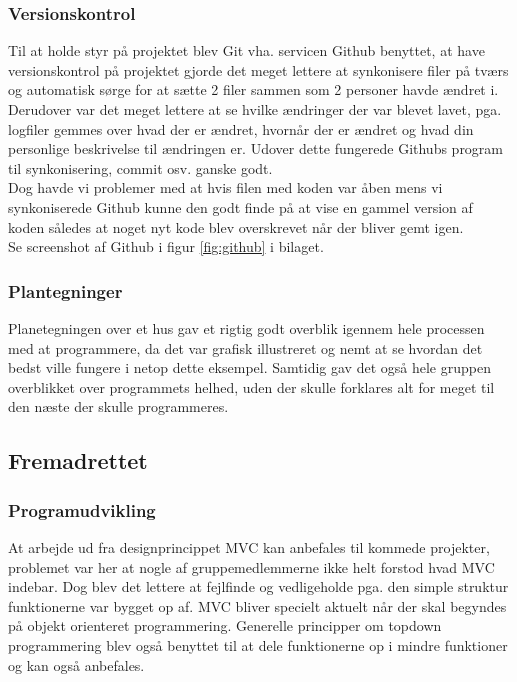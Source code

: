 \subsubsection{Versionskontrol}
Til at holde styr på projektet blev Git vha. servicen Github benyttet, at have versionskontrol på projektet gjorde det meget lettere at synkonisere filer på tværs og automatisk sørge for at sætte 2 filer sammen som 2 personer havde ændret i. Derudover var det meget lettere at se hvilke ændringer der var blevet lavet, pga. logfiler gemmes over hvad der er ændret, hvornår der er ændret og hvad din personlige beskrivelse til ændringen er. Udover dette fungerede Githubs program til synkonisering, commit osv. ganske godt.\\

Dog havde vi problemer med at hvis filen med koden var åben mens vi synkoniserede Github kunne den godt finde på at vise en gammel version af koden således at noget nyt kode blev overskrevet når der bliver gemt igen.\\

Se screenshot af Github i figur \ref{fig:github} i bilaget.\\

\subsubsection{Plantegninger}
Planetegningen over et hus gav et rigtig godt overblik igennem hele processen med at programmere, da det var grafisk illustreret og nemt at se hvordan det bedst ville fungere i netop dette eksempel. Samtidig gav det også hele gruppen overblikket over programmets helhed, uden der skulle forklares alt for meget til den næste der skulle programmeres.

\subsection{Fremadrettet}
\subsubsection{Programudvikling}
At arbejde ud fra designprincippet MVC kan anbefales til kommede projekter, problemet var her at nogle af gruppemedlemmerne ikke helt forstod hvad MVC indebar. Dog blev det lettere at fejlfinde og vedligeholde pga. den simple struktur funktionerne var bygget op af. MVC bliver specielt aktuelt når der skal begyndes på objekt orienteret programmering. Generelle principper om topdown programmering blev også benyttet til at dele funktionerne op i mindre funktioner og kan også anbefales.\\

